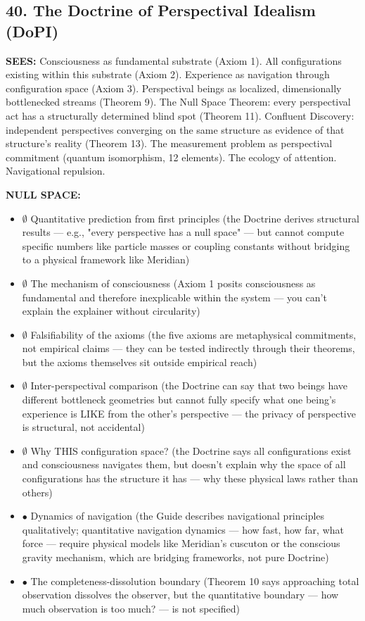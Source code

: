 \subsection*{40. The Doctrine of Perspectival Idealism (DoPI)}


\textbf{SEES:} Consciousness as fundamental substrate (Axiom 1). All configurations existing within this substrate (Axiom 2). Experience as navigation through configuration space (Axiom 3). Perspectival beings as localized, dimensionally bottlenecked streams (Theorem 9). The Null Space Theorem: every perspectival act has a structurally determined blind spot (Theorem 11). Confluent Discovery: independent perspectives converging on the same structure as evidence of that structure's reality (Theorem 13). The measurement problem as perspectival commitment (quantum isomorphism, 12 elements). The ecology of attention. Navigational repulsion.


\textbf{NULL SPACE:}

\begin{itemize}[nosep,leftmargin=*]
  \item $\emptyset$ Quantitative prediction from first principles (the Doctrine derives structural results — e.g., "every perspective has a null space" — but cannot compute specific numbers like particle masses or coupling constants without bridging to a physical framework like Meridian)
  \item $\emptyset$ The mechanism of consciousness (Axiom 1 posits consciousness as fundamental and therefore inexplicable within the system — you can't explain the explainer without circularity)
  \item $\emptyset$ Falsifiability of the axioms (the five axioms are metaphysical commitments, not empirical claims — they can be tested indirectly through their theorems, but the axioms themselves sit outside empirical reach)
  \item $\emptyset$ Inter-perspectival comparison (the Doctrine can say that two beings have different bottleneck geometries but cannot fully specify what one being's experience is LIKE from the other's perspective — the privacy of perspective is structural, not accidental)
  \item $\emptyset$ Why THIS configuration space? (the Doctrine says all configurations exist and consciousness navigates them, but doesn't explain why the space of all configurations has the structure it has — why these physical laws rather than others)
  \item $\bullet$ Dynamics of navigation (the Guide describes navigational principles qualitatively; quantitative navigation dynamics — how fast, how far, what force — require physical models like Meridian's cuscuton or the conscious gravity mechanism, which are bridging frameworks, not pure Doctrine)
  \item $\bullet$ The completeness-dissolution boundary (Theorem 10 says approaching total observation dissolves the observer, but the quantitative boundary — how much observation is too much? — is not specified)
\end{itemize}


